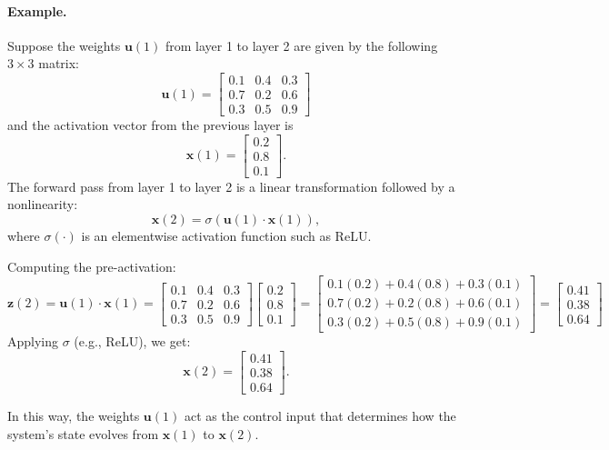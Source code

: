 \paragraph{Example.} Suppose the weights \(\mathbf{u}(1)\) from layer 1 to layer 2 are given by the following \(3 \times 3\) matrix:
\[
\mathbf{u}(1) =
\begin{bmatrix}
0.1 & 0.4 & 0.3 \\
0.7 & 0.2 & 0.6 \\
0.3 & 0.5 & 0.9
\end{bmatrix}
\]
and the activation vector from the previous layer is
\[
\mathbf{x}(1) = 
\begin{bmatrix}
0.2 \\
0.8 \\
0.1
\end{bmatrix}.
\]
The forward pass from layer 1 to layer 2 is a linear transformation followed by a nonlinearity:
\[
\mathbf{x}(2) = \sigma\left(\mathbf{u}(1) \cdot \mathbf{x}(1)\right),
\]
where \(\sigma(\cdot)\) is an elementwise activation function such as ReLU.

Computing the pre-activation:
\[
\mathbf{z}(2) = \mathbf{u}(1) \cdot \mathbf{x}(1) =
\begin{bmatrix}
0.1 & 0.4 & 0.3 \\
0.7 & 0.2 & 0.6 \\
0.3 & 0.5 & 0.9
\end{bmatrix}
\begin{bmatrix}
0.2 \\
0.8 \\
0.1
\end{bmatrix}
=
\begin{bmatrix}
0.1(0.2) + 0.4(0.8) + 0.3(0.1) \\
0.7(0.2) + 0.2(0.8) + 0.6(0.1) \\
0.3(0.2) + 0.5(0.8) + 0.9(0.1)
\end{bmatrix}
=
\begin{bmatrix}
0.41 \\
0.38 \\
0.64
\end{bmatrix}
\]
Applying \(\sigma\) (e.g., ReLU), we get:
\[
\mathbf{x}(2) = 
\begin{bmatrix}
0.41 \\
0.38 \\
0.64
\end{bmatrix}.
\]

In this way, the weights \(\mathbf{u}(1)\) act as the control input that determines how the system’s state evolves from \(\mathbf{x}(1)\) to \(\mathbf{x}(2)\).



